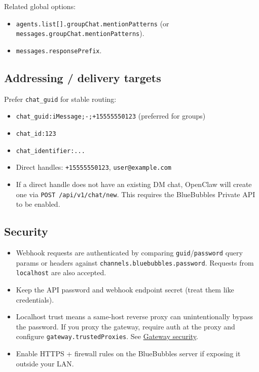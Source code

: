 Related global options:

\begin{itemize}
  \item \texttt{agents.list[].groupChat.mentionPatterns} (or \texttt{messages.groupChat.mentionPatterns}).
  \item \texttt{messages.responsePrefix}.
\end{itemize}


\subsection{Addressing / delivery targets}


Prefer \texttt{chat\_guid} for stable routing:

\begin{itemize}
  \item \texttt{chat\_guid:iMessage;-;+15555550123} (preferred for groups)
  \item \texttt{chat\_id:123}
  \item \texttt{chat\_identifier:...}
  \item Direct handles: \texttt{+15555550123}, \texttt{user@example.com}
  \item If a direct handle does not have an existing DM chat, OpenClaw will create one via \texttt{POST /api/v1/chat/new}. This requires the BlueBubbles Private API to be enabled.
\end{itemize}


\subsection{Security}


\begin{itemize}
  \item Webhook requests are authenticated by comparing \texttt{guid}/\texttt{password} query params or headers against \texttt{channels.bluebubbles.password}. Requests from \texttt{localhost} are also accepted.
  \item Keep the API password and webhook endpoint secret (treat them like credentials).
  \item Localhost trust means a same-host reverse proxy can unintentionally bypass the password. If you proxy the gateway, require auth at the proxy and configure \texttt{gateway.trustedProxies}. See \href{/gateway/security\#reverse-proxy-configuration}{Gateway security}.
  \item Enable HTTPS + firewall rules on the BlueBubbles server if exposing it outside your LAN.
\end{itemize}



